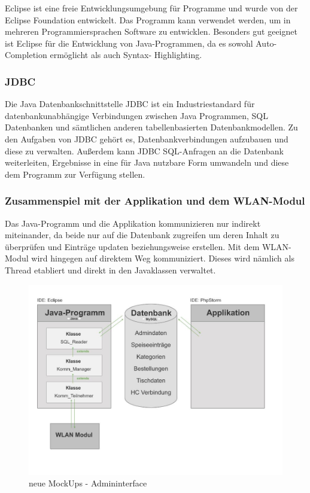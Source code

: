 Eclipse ist eine freie Entwicklungsumgebung für Programme und wurde von der Eclipse Foundation entwickelt. Das Programm kann verwendet werden, um in mehreren Programmiersprachen Software zu entwicklen. Besonders gut geeignet ist Eclipse für die Entwicklung von Java-Programmen, da es sowohl Auto-Completion ermöglicht als auch Syntax- Highlighting.

	   \subsubsection{JDBC}

Die Java Datenbankschnittstelle JDBC ist ein Industriestandard für datenbankunabhängige Verbindungen zwischen Java Programmen, SQL Datenbanken und sämtlichen anderen tabellenbasierten Datenbankmodellen. Zu den Aufgaben von JDBC gehört es, Datenbankverbindungen aufzubauen und diese zu verwalten. Außerdem kann JDBC  SQL-Anfragen an die Datenbank weiterleiten, Ergebnisse in eine für Java nutzbare Form umwandeln und diese dem Programm zur Verfügung stellen.

	   \subsubsection{Zusammenspiel mit der Applikation und dem WLAN-Modul}
Das Java-Programm und die Applikation kommunizieren nur indirekt miteinander, da beide nur auf die Datenbank zugreifen um deren Inhalt zu überprüfen und Einträge updaten beziehungsweise erstellen.
Mit dem WLAN-Modul wird hingegen auf direktem Weg kommuniziert. Dieses wird nämlich als Thread etabliert und direkt in den Javaklassen verwaltet.
			\begin{figure}[H]
			\begin{centering}
			\includegraphics[width = 1\textwidth]{Bilder/Jok_zusammenspiel_java.jpg}
			\par\end{centering}
			\caption{neue MockUps - Admininterface}
			\label{neue MockUps - Admininterface}
			\end{figure}
